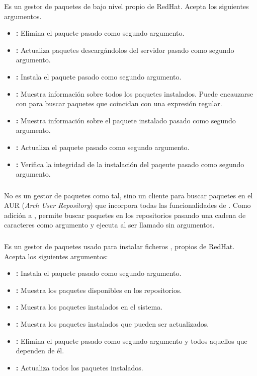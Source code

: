 Es un gestor de paquetes de bajo nivel propio de RedHat.
Acepta los siguientes argumentos.

\begin{itemize}
	\item{}\textbf{:} Elimina el paquete pasado como segundo argumento.
	\item{}\textbf{:} Actualiza paquetes descargándolos del servidor pasado como segundo argumento.
	\item{}\textbf{:} Instala el paquete pasado como segundo argumento.
	\item{}\textbf{:} Muestra información sobre todos los paquetes instalados. Puede encauzarse con  para buscar paquetes que coincidan con una expresión regular.
	\item{}\textbf{:} Muestra información sobre el paquete instalado pasado como segundo argumento.
	\item{}\textbf{:} Actualiza el paquete pasado como segundo argumento.
	\item{}\textbf{:} Verifica la integridad de la instalación del paqeute pasado como segundo argumento.
\end{itemize}

\subsubsection{}

No es un gestor de paquetes como tal, sino un cliente para buscar paquetes en el AUR (\emph{Arch User Repository}) que incorpora todas las funcionalidades de .
Como adición a , permite buscar paquetes en los repositorios pasando una cadena de caracteres como argumento y ejecuta  al ser llamado sin argumentos.

\subsubsection{}

Es un gestor de paquetes usado para instalar ficheros , propios de RedHat.
Acepta los siguientes argumentos:

\begin{itemize}
	\item{}\textbf{:} Instala el paquete pasado como segundo argumento.
	\item{}\textbf{:} Muestra los paquetes disponibles en los repositorios.
	\item{}\textbf{:} Muestra los paquetes instalados en el sistema.
	\item{}\textbf{:} Muestra los paquetes instalados que pueden ser actualizados.
	\item{}\textbf{:} Elimina el paquete pasado como segundo argumento y todos aquellos que dependen de él.
	\item{}\textbf{:} Actualiza todos los paquetes instalados.
\end{itemize}


